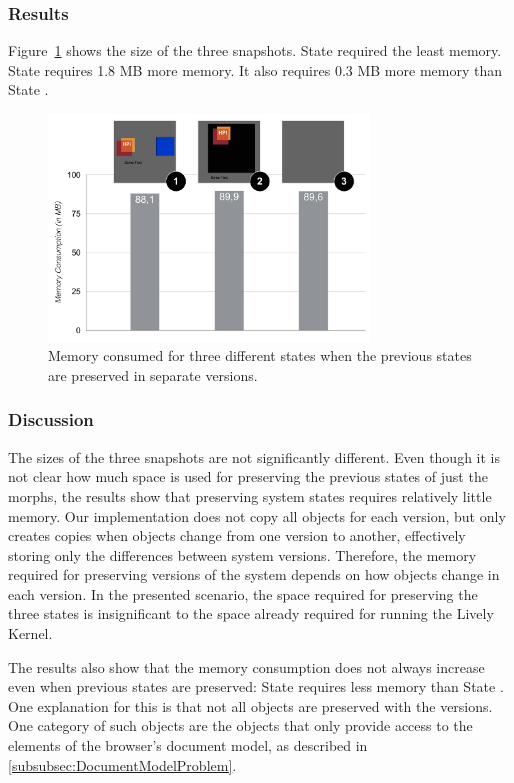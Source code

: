 \subsubsection{Results}
Figure~\ref{fig:MemoryOverheadForVersions} shows the size of the three snapshots.
State  required the least memory.
State  requires 1.8 MB more memory.
It also requires 0.3 MB more memory than State .

\begin{figure}[h!]
    \centering
    \includegraphics[width=0.76\textwidth]{figures/6_evaluation/2_memoryForVersions.pdf}
    \caption{Memory consumed for three different states when the previous states are preserved in separate versions.}
    \label{fig:MemoryOverheadForVersions}
\end{figure}

\subsubsection{Discussion}

The sizes of the three snapshots are not significantly different.
Even though it is not clear how much space is used for preserving the previous states of just the morphs, the results show that preserving system states requires relatively little memory.
Our implementation does not copy all objects for each version, but only creates copies when objects change from one version to another, effectively storing only the differences between system versions.
Therefore, the memory required for preserving versions of the system depends on how objects change in each version.
In the presented scenario, the space required for preserving the three states is insignificant to the space already required for running the Lively Kernel.

The results also show that the memory consumption does not always increase even when previous states are preserved: State  requires less memory than State .
One explanation for this is that not all objects are preserved with the versions.
One category of such objects are the objects that only provide access to the elements of the browser's document model, as described in \ref{subsubsec:DocumentModelProblem}.


